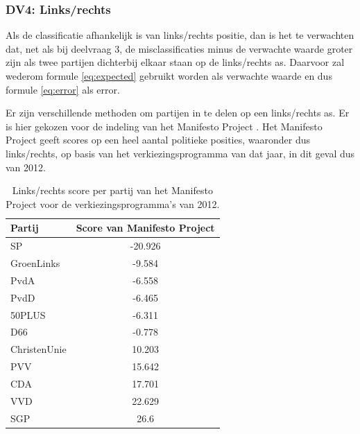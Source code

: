 \subsubsection{DV4: Links/rechts}
Als de classificatie afhankelijk is van links/rechts positie, dan is het te verwachten dat, net als bij deelvraag 3, de misclassificaties minus de verwachte waarde groter zijn als twee partijen dichterbij elkaar staan op de links/rechts as. Daarvoor zal wederom formule \ref{eq:expected} gebruikt worden als verwachte waarde en dus formule \ref{eq:error} als error.\par
Er zijn verschillende methoden om partijen in te delen op een links/rechts as. Er is hier gekozen voor de indeling van het Manifesto Project \cite{Volkens:2017}. Het Manifesto Project geeft scores op een heel aantal politieke posities, waaronder dus links/rechts, op basis van het verkiezingsprogramma van dat jaar, in dit geval dus van 2012.\par
\begin{table}[H]
\centering
\caption{Links/rechts score per partij van het Manifesto Project voor de verkiezingsprogramma's van 2012.}
\label{my-label}
\centering
\begin{tabular}{lc}
\hline
Partij  & Score van Manifesto Project \\ \hline
SP           & -20.926 \\ 
GroenLinks   & -9.584 \\ 
PvdA         & -6.558 \\ 
PvdD         & -6.465 \\ 
50PLUS       & -6.311\\ 
D66          & -0.778\\ 
ChristenUnie & 10.203\\ 
PVV          & 15.642\\ 
CDA          & 17.701\\
VVD          & 22.629\\ 
SGP          & 26.6\\ 
\end{tabular}
\end{table}

